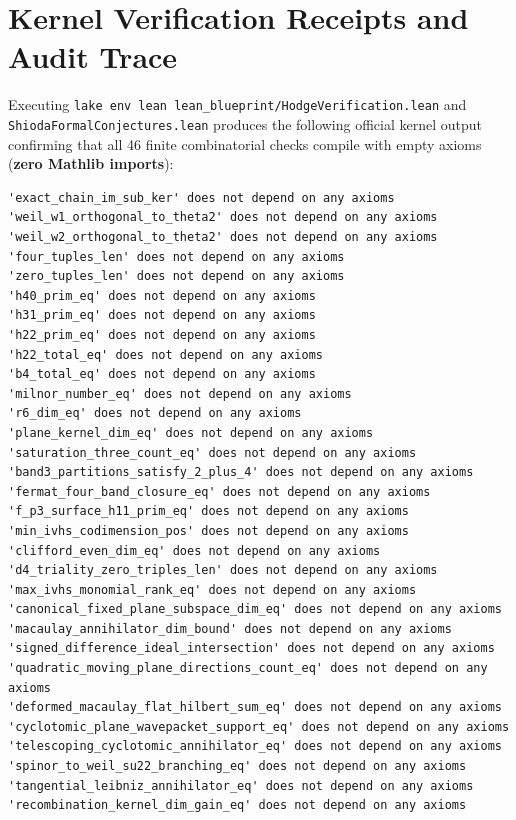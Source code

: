 \documentclass[11pt,a4paper]{article}
\begin{document}
\newpage
\section{Kernel Verification Receipts and Audit Trace}

Executing \texttt{lake env lean lean\_blueprint/HodgeVerification.lean} and \texttt{ShiodaFormalConjectures.lean} produces the following official kernel output confirming that all 46 finite combinatorial checks compile with empty axioms (\textbf{zero Mathlib imports}):

\begin{lstlisting}[style=leancode]
'exact_chain_im_sub_ker' does not depend on any axioms
'weil_w1_orthogonal_to_theta2' does not depend on any axioms
'weil_w2_orthogonal_to_theta2' does not depend on any axioms
'four_tuples_len' does not depend on any axioms
'zero_tuples_len' does not depend on any axioms
'h40_prim_eq' does not depend on any axioms
'h31_prim_eq' does not depend on any axioms
'h22_prim_eq' does not depend on any axioms
'h22_total_eq' does not depend on any axioms
'b4_total_eq' does not depend on any axioms
'milnor_number_eq' does not depend on any axioms
'r6_dim_eq' does not depend on any axioms
'plane_kernel_dim_eq' does not depend on any axioms
'saturation_three_count_eq' does not depend on any axioms
'band3_partitions_satisfy_2_plus_4' does not depend on any axioms
'fermat_four_band_closure_eq' does not depend on any axioms
'f_p3_surface_h11_prim_eq' does not depend on any axioms
'min_ivhs_codimension_pos' does not depend on any axioms
'clifford_even_dim_eq' does not depend on any axioms
'd4_triality_zero_triples_len' does not depend on any axioms
'max_ivhs_monomial_rank_eq' does not depend on any axioms
'canonical_fixed_plane_subspace_dim_eq' does not depend on any axioms
'macaulay_annihilator_dim_bound' does not depend on any axioms
'signed_difference_ideal_intersection' does not depend on any axioms
'quadratic_moving_plane_directions_count_eq' does not depend on any axioms
'deformed_macaulay_flat_hilbert_sum_eq' does not depend on any axioms
'cyclotomic_plane_wavepacket_support_eq' does not depend on any axioms
'telescoping_cyclotomic_annihilator_eq' does not depend on any axioms
'spinor_to_weil_su22_branching_eq' does not depend on any axioms
'tangential_leibniz_annihilator_eq' does not depend on any axioms
'recombination_kernel_dim_gain_eq' does not depend on any axioms

\end{lstlisting}
\end{document}
